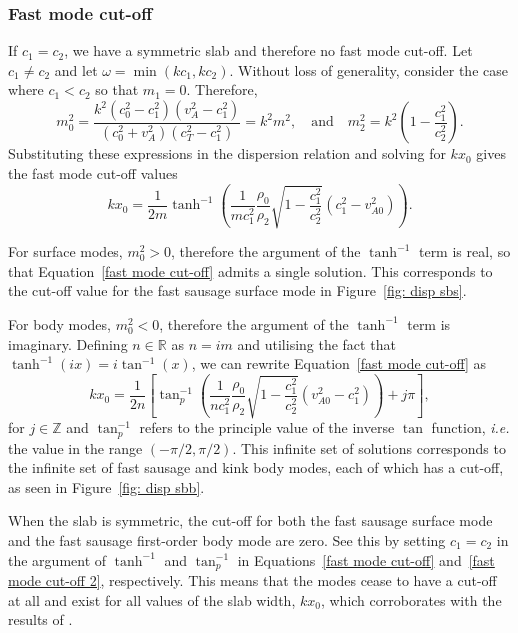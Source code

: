 \documentclass[12pt]{../style-files/ociamthesis}
\begin{document}
\subsubsection{Fast mode cut-off} \label{sec: fast mode cut-off}
If $c_1 = c_2$, we have a symmetric slab and therefore no fast mode cut-off. Let $c_1 \neq c_2$ and let $\omega = \min(kc_1, kc_2)$. Without loss of generality, consider the case where $c_1 < c_2$ so that $m_1 = 0$. Therefore,
\begin{equation}
m_0^2 = \frac{k^2 (c_0^2 - c_1^2)(v_A^2 - c_1^2)}{(c_0^2 + v_A^2)(c_T^2 - c_1^2)} = k^2m^2,
\quad \text{and} \quad
m_2^2 = k^2\left(1-\frac{c_1^2}{c_2^2}\right).
\end{equation}
Substituting these expressions in the dispersion relation and solving for $kx_0$ gives the fast mode cut-off values
\begin{equation}
kx_0 = \frac{1}{2m} \tanh^{-1}\left( \frac{1}{m c_1^2} \frac{\rho_0}{\rho_2} \sqrt{1 - \frac{c_1^2}{c_2^2}}(c_1^2 - v_{A0}^2) \right). \label{fast mode cut-off}
\end{equation}

For surface modes, $m_0^2 > 0$, therefore the argument of the $\tanh^{-1}$ term is real, so that Equation~\eqref{fast mode cut-off} admits a single solution. This corresponds to the cut-off value for the fast sausage surface mode in Figure~\ref{fig: disp sbs}.
 
For body modes, $m_0^2 < 0$, therefore the argument of the $\tanh^{-1}$ term is imaginary. Defining $n \in \mathbb{R}$ as $n = im$ and utilising the fact that $\tanh^{-1}(ix) = i\tan^{-1}(x)$, we can rewrite Equation~\eqref{fast mode cut-off} as
\begin{equation}
kx_0 = \frac{1}{2n} \left[\tan_p^{-1}\left( \frac{1}{n c_1^2} \frac{\rho_0}{\rho_2} \sqrt{1 - \frac{c_1^2}{c_2^2}}(v_{A0}^2 - c_1^2) \right) + j\pi \right], \label{fast mode cut-off 2}
\end{equation}
for $j \in \mathbb{Z}$ and $\tan_p^{-1}$ refers to the principle value of the inverse $\tan$ function, \textit{i.e.} the value in the range $(-\pi/2, \pi/2)$. This infinite set of solutions corresponds to the infinite set of fast sausage and kink body modes, each of which has a cut-off, as seen in Figure~\ref{fig: disp sbb}.

When the slab is symmetric, the cut-off for both the fast sausage surface mode and the fast sausage first-order body mode are zero. See this by setting $c_1 = c_2$ in the argument of $\tanh^{-1}$ and $\tan_p^{-1}$ in Equations~\eqref{fast mode cut-off} and~\eqref{fast mode cut-off 2}, respectively. This means that the modes cease to have a cut-off at all and exist for all values of the slab width, $kx_0$, which corroborates with the results of \cite{rob81b}.
\end{document}
